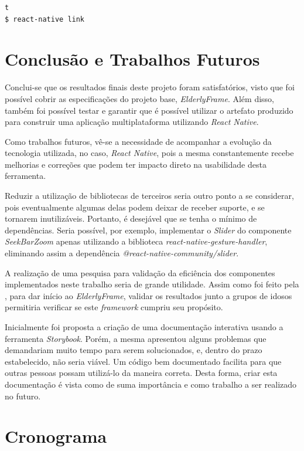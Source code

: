 \documentclass[
	12pt,				    %
	openright,			    %
	oneside,			    %
	a4paper,			    %
    sumario=tradicional,    %
	english,			    %
	brazil,				    %
	]{abntex2}              %
\begin{document}
\begin{lstlisting}[language=bash]t
$ react-native link
\end{lstlisting}

\chapter{Conclusão e Trabalhos Futuros}\label{sec:futuro}

Conclui-se que os resultados finais deste projeto foram satisfatórios, visto que foi possível cobrir as especificações do projeto base, \textit{ElderlyFrame}. Além disso, também foi possível testar e garantir que é possível utilizar o artefato produzido para construir uma aplicação multiplataforma utilizando \textit{React Native}.

Como trabalhos futuros, vê-se a necessidade de acompanhar a evolução da tecnologia utilizada, no caso, \textit{React Native}, pois a mesma constantemente recebe melhorias e correções que podem ter impacto direto na usabilidade desta ferramenta.

Reduzir a utilização de bibliotecas de terceiros seria outro ponto a se considerar, pois eventualmente algumas delas podem deixar de receber suporte, e se tornarem inutilizáveis. Portanto, é desejável que se tenha o mínimo de dependências. Seria possível, por exemplo, implementar o \textit{Slider} do componente \textit{SeekBarZoom} apenas utilizando a biblioteca \textit{react-native-gesture-handler}, eliminando assim a dependência \textit{@react-native-community/slider}.

A realização de uma pesquisa para validação da eficiência dos componentes implementados neste trabalho seria de grande utilidade. Assim como foi feito pela \Cite{tesedamaris}, para dar início ao \textit{ElderlyFrame}, validar os resultados junto a grupos de idosos permitiria verificar se este \textit{framework} cumpriu seu propósito.

\par

Inicialmente foi proposta a criação de uma documentação interativa usando a ferramenta \textit{Storybook}. Porém, a mesma apresentou alguns problemas que demandariam muito tempo para serem solucionados, e, dentro do prazo estabelecido, não seria viável. Um código bem documentado facilita para que outras pessoas possam utilizá-lo da maneira correta. Desta forma, criar esta documentação é vista como de suma importância e como trabalho a ser realizado no futuro.

\chapter{Cronograma}\label{sec:cronograma}
\end{document}
